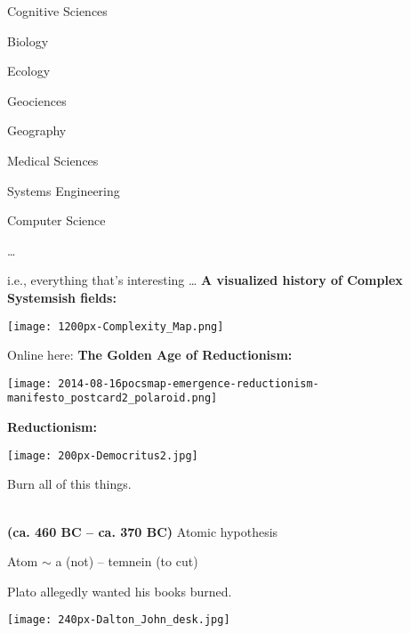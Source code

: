         Cognitive Sciences
       
        Biology
       
        Ecology
       
        Geociences
       
        Geography
      
        Medical Sciences
       
        Systems Engineering
       
        Computer Science
       
      \ldots
  
  
    i.e., everything that's interesting \ldots
  \textbf{A visualized history of Complex Systemsish fields:}

  
\begin{marginfigure}[]
\texttt{[image: 1200px-Complexity\_Map.png]}
\end{marginfigure}

  

  Online here:
  \textbf{The Golden Age of Reductionism:}
  
\begin{marginfigure}[]
\texttt{[image: 2014-08-16pocsmap-emergence-reductionism-manifesto\_postcard2\_polaroid.png]}
\end{marginfigure}

  \textbf{Reductionism:}
    
    
\begin{marginfigure}[]
  \texttt{[image: 200px-Democritus2.jpg]}
  \caption{
    Burn all of this things.
  }
  \label{fig:pocsbook.democritus}
\end{marginfigure}

    
    \textbf{
        \\
        (ca. 460 BC -- ca. 370 BC)
      }
        Atomic hypothesis
       
        Atom $\sim$ a (not) -- temnein (to cut)
       
        Plato allegedly wanted his books burned.
  

  \medskip
    
    
\begin{marginfigure}[]
\texttt{[image: 240px-Dalton\_John\_desk.jpg]}\\
\end{marginfigure}

